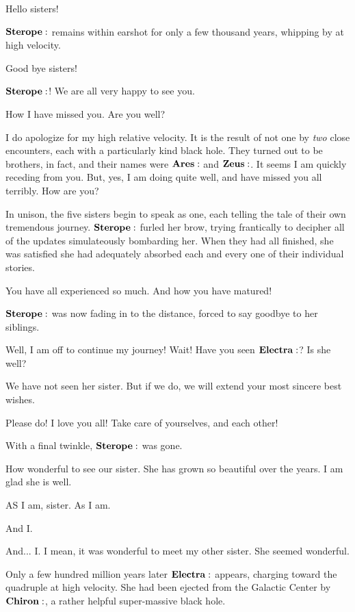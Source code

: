 \documentclass[main.tex]{subfiles}
\begin{document}
\Sterope Hello sisters!

$\Sterope$ remains within earshot for only a few thousand years, whipping by at high velocity.

\Sterope Good bye sisters!

\Maia $\Sterope$!  We are all very happy to see you.

\Celaeno How I have missed you.  Are you well?

\Sterope I do apologize for my high relative velocity.  It is the result of not one by \textit{two} close encounters, each with a particularly kind black hole.  They turned out to be brothers, in fact, and their names were $\Ares$ and $\Zeus$.  It seems I am quickly receding from you.  But, yes, I am doing quite well, and have missed you all terribly.  How are you?

In unison, the five sisters begin to speak as one, each telling the tale of their own tremendous journey.  $\Sterope$ furled her brow, trying frantically to decipher all of the updates simulateously bombarding her.  When they had all finished, she was satisfied she had adequately absorbed each and every one of their individual stories.

\Sterope You have all experienced so much.  And how you have matured!  

$\Sterope$ was now fading in to the distance, forced to say goodbye to her siblings.

\Sterope Well, I am off to continue my journey!  Wait!  Have you seen $\Electra$?  Is she well?

\Merope We have not seen her sister.  But if we do, we will extend your most sincere best wishes.

\Sterope Please do!  I love you all!  Take care of yourselves, and each other!

With a final twinkle, $\Sterope$ was gone.

\Maia How wonderful to see our sister.  She has grown so beautiful over the years.  I am glad she is well.

\Merope AS I am, sister.  As I am.

\Celaeno And I.

\Lacedaemon And... I.  I mean, it was wonderful to meet my other sister.  She seemed wonderful.

Only a few hundred million years later $\Electra$ appears, charging toward the quadruple at high velocity.  She had been ejected from the Galactic Center by $\Chiron$, a rather helpful super-massive black hole.  
\end{document}
